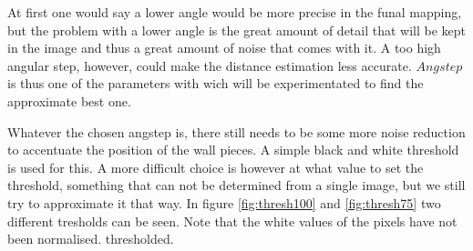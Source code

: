 \documentclass[a4paper, 20pt]{report}
\begin{document}
\begin{figure}[!ht]
\centering
\begin{floatrow}
  
\end{floatrow}
\end{figure}

At first one would say a lower angle would be more precise in the funal mapping, 
but the problem with a lower angle is the great amount of detail that will be
kept in the image and thus a
great amount of noise that comes with it. A too high angular step, however,
could make the distance estimation less accurate.
$Angstep$ is thus one of the parameters with
wich will be experimentated to find the approximate best one.

Whatever the chosen angstep is, there still needs to be some more noise
reduction to accentuate the position of the wall pieces. A simple black and
white threshold is used for this. A more difficult choice is however at what
value to set the threshold, something that can not be determined from a single
image, but we still try to approximate it that way. In figure \ref{fig:thresh100} and
\ref{fig:thresh75} two different tresholds can be seen. Note that the white
values  of the pixels have not been normalised.
thresholded.
\end{document}
